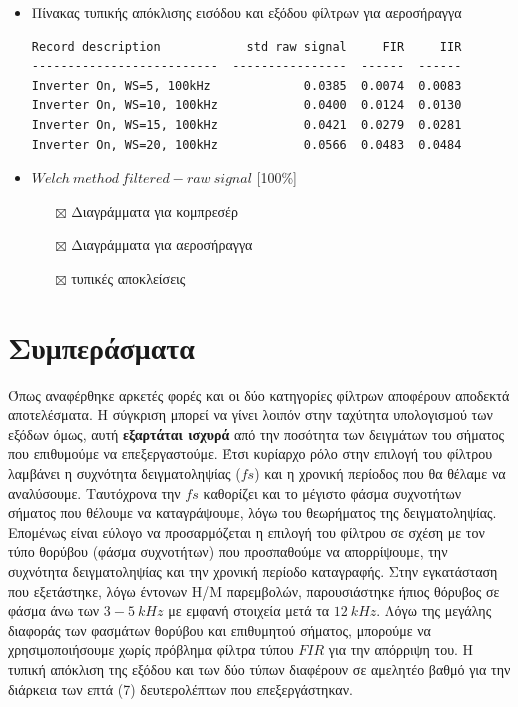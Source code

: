 \documentclass[breaklines=true, 12pt]{article}
\begin{document}
\clearpage
\begin{itemize}
\item Πίνακας τυπικής απόκλισης εισόδου και εξόδου φίλτρων για αεροσήραγγα
\begin{verbatim}
Record description            std raw signal     FIR     IIR
--------------------------  ----------------  ------  ------
Inverter On, WS=5, 100kHz             0.0385  0.0074  0.0083
Inverter On, WS=10, 100kHz            0.0400  0.0124  0.0130
Inverter On, WS=15, 100kHz            0.0421  0.0279  0.0281
Inverter On, WS=20, 100kHz            0.0566  0.0483  0.0484
\end{verbatim}
\end{itemize}


\begin{itemize}
\item \(Welch\ method\ filtered-raw\ signal\) [100\%]
\begin{itemize}
\item[{$\boxtimes$}] Διαγράμματα για κομπρεσέρ
\item[{$\boxtimes$}] Διαγράμματα για αεροσήραγγα
\item[{$\boxtimes$}] τυπικές αποκλείσεις
\end{itemize}
\end{itemize}
\section{Συμπεράσματα}
\label{sec:org129f5ce}
Όπως αναφέρθηκε αρκετές φορές και οι δύο κατηγορίες φίλτρων αποφέρουν αποδεκτά
αποτελέσματα. Η σύγκριση μπορεί να γίνει λοιπόν στην ταχύτητα
υπολογισμού των εξόδων όμως, αυτή \textbf{εξαρτάται ισχυρά} από την ποσότητα των
δειγμάτων του σήματος που επιθυμούμε να επεξεργαστούμε. Έτσι κυρίαρχο
ρόλο στην επιλογή του φίλτρου λαμβάνει η συχνότητα δειγματοληψίας (\(fs\)) και η
χρονική περίοδος που θα θέλαμε να αναλύσουμε. Ταυτόχρονα την \(fs\) καθορίζει
και το μέγιστο φάσμα συχνοτήτων σήματος που θέλουμε να καταγράψουμε, λόγω του
θεωρήματος της δειγματοληψίας. Επομένως είναι εύλογο να προσαρμόζεται η
επιλογή του φίλτρου σε σχέση με τον τύπο θορύβου (φάσμα συχνοτήτων)
που προσπαθούμε να απορρίψουμε, την συχνότητα δειγματοληψίας και την χρονική
περίοδο καταγραφής. Στην εγκατάσταση που εξετάστηκε, λόγω έντονων Η/Μ
παρεμβολών, παρουσιάστηκε ήπιος θόρυβος σε φάσμα άνω των \(3-5\ kHz\) με εμφανή
στοιχεία μετά τα \(12\ kHz\). Λόγω της μεγάλης διαφοράς των φασμάτων θορύβου και
επιθυμητού σήματος, μπορούμε να χρησιμοποιήσουμε χωρίς πρόβλημα φίλτρα τύπου
\(FIR\) για την απόρριψη του. Η τυπική απόκλιση της εξόδου και των δύο τύπων
διαφέρουν σε αμελητέο βαθμό για την διάρκεια των επτά (7) δευτερολέπτων που
επεξεργάστηκαν.
\end{document}
